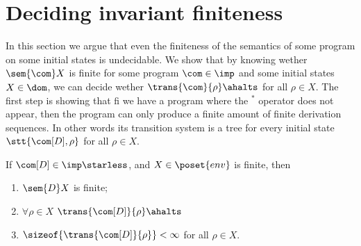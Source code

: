 \section{Deciding invariant finiteness}\label{sec:finiteness}

In this section we argue that even the finiteness of the semantics of
some program on some initial states is undecidable. We show that by
knowing wether \(\sem{\com}X\) is finite for some program
\(\com\in\imp\) and some initial states \(X\in \dom\), we can decide
wether \(\trans{\com}{\rho}\ahalts\) for all \(\rho \in X\). The first
step is showing that fi we have a program where the \(^*\) operator
does not appear, then the program can only produce a finite amount of
finite derivation sequences. In other words its transition system is a tree for every
initial state \(\stt{\com[D], \rho}\) for all \(\rho \in X\).

\begin{lemma}\label{le:finiteness}
  If \(\com[D]\in\imp\starless\), and \(X \in \poset{env}\) is
  finite, then
  \begin{enumerate}[label=(\roman*).]
  \item \(\sem{D}X\) is finite;
  \item \(\forall \rho \in X\) \(\trans{\com[D]}{\rho}\ahalts\)
  \item \(\sizeof{\trans{\com[D]}{\rho}} < \infty\) for all
    \(\rho \in X\).
  \end{enumerate}
\end{lemma}

